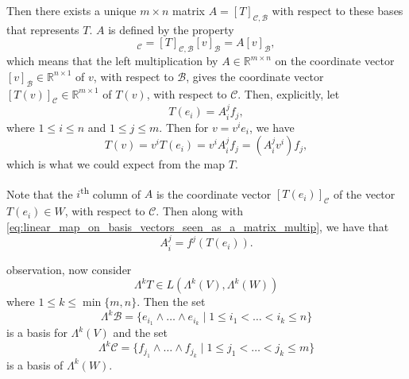 \documentclass[notoc,notitlepage]{tufte-book}
\begin{document}
Then there exists a unique $m \times n$ matrix $A = [T]_{\mathcal{C},
\mathcal{B}}$ with respect to these bases that represents $T$. $A$ is defined by
the property
\begin{equation*}
  [T(v)]_{\mathcal{C}} = [T]_{\mathcal{C}, \mathcal{B}} [v]_{\mathcal{B}} =
  A[v]_{\mathcal{B}},
\end{equation*}
which means that the left multiplication by $A \in \mathbb{R}^{m \times n}$ on
the coordinate vector $[v]_{\mathcal{B}} \in \mathbb{R}^{n \times 1}$ of $v$,
with respect to $\mathcal{B}$, gives the coordinate vector $[T(v)]_{\mathcal{C}}
\in \mathbb{R}^{m \times 1}$ of $T(v)$, with respect to $\mathcal{C}$. Then,
explicitly, let
\begin{equation}\label{eq:linear_map_on_basis_vectors_seen_as_a_matrix_multip}
  T(e_i) = A^j_i f_j,
\end{equation}
where $1 \leq i \leq n$ and $1 \leq j \leq m$. Then for $v = v^i e_i$, we have
\begin{equation*}
  T(v) = v^i T(e_i) = v^i A^j_i f_j = (A^j_i v^i) f_j,
\end{equation*}
which is what we could expect from the map $T$.

Note that the $i$\textsuperscript{th} column of $A$ is the coordinate vector
$[T(e_i)]_{\mathcal{C}}$ of the vector $T(e_i) \in W$, with respect to
$\mathcal{C}$. Then along with
\cref{eq:linear_map_on_basis_vectors_seen_as_a_matrix_multip}, we have that
\begin{equation}\label{eq:matrix_of_the_linear_map_using_the_dual_basis}
  A^j_i = f^j ( T(e_i) ).
\end{equation}

 observation, now consider
\begin{equation*}
  \Lambda^k T \in L(\Lambda^k(V), \Lambda^k(W))
\end{equation*}
where $1 \leq k \leq \min \{ m, n \}$. Then the set
\begin{equation*}
  \Lambda^k \mathcal{B} = \{ e_{i_1} \land \hdots \land e_{i_k} \mid 1 \leq i_1
  < \hdots < i_k \leq n \}
\end{equation*}
is a basis for $\Lambda^k(V)$ and the set
\begin{equation*}
  \Lambda^k \mathcal{C} = \{ f_{j_1} \land \hdots \land f_{j_k} \mid 1 \leq j_1
  < \hdots < j_k \leq m \}
\end{equation*}
is a basis of $\Lambda^k(W)$.
\end{document}
